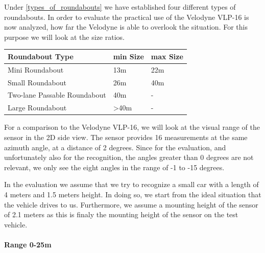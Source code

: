 \documentclass[11pt,oneside,openright]{mpreport}
\begin{document}
Under \cref{types_of_roundabouts} we have established four different types of roundabouts. In order to evaluate the practical use of the Velodyne VLP-16 is now analyzed,
how far the Velodyne is able to overlook the situation. For this purpose we will look at the size ratios.


\begin{tabularx}{\textwidth}{|X|X|X|}
\hline \textbf{Roundabout Type} & \textbf{min Size} & \textbf{max Size} \\\hline
Mini Roundabout& 13m & 22m \\\hline
Small Roundabout& 26m  & 40m \\\hline
Two-lane Passable Roundabout& 40m & - \\\hline
Large Roundabout& >40m &  - \\\hline
\end{tabularx}


For a comparison to the Velodyne VLP-16, we will look at the visual range of the sensor in the 2D side view. The sensor provides 16 measurements at the same azimuth angle,
at a distance of 2 degrees. Since for the evaluation, and unfortunately also for the recognition, the angles greater than 0 degrees are not relevant,
we only see the eight angles in the range of -1 to -15 degrees.


In the evaluation we assume that we try to recognize a small car with a length of 4 meters and 1.5 meters height. In doing so, we start from the ideal situation that the vehicle drives to us.
Furthermore, we assume a mounting height of the sensor of 2.1 meters as this is finaly the mounting height of the sensor on the test vehicle.

\paragraph{Range 0-25m}
\end{document}
